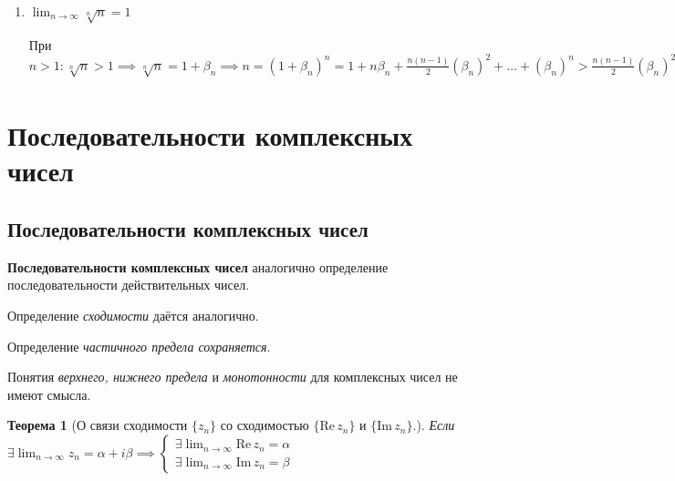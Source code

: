 \documentclass[a4paper,oneside]{article}
\newcommand{\imagin}{\mathrm{Im} \,}
\newcommand{\real}{\mathrm{Re} \,}
\newcommand{\dslim}{\displaystyle\lim}
\newcommand{\dslimn}{\dslim_{n \to \infty}}
\newtheorem{theorem}{Теорема}[subsection]
\begin{document}
\begin{enumerate}
    $\implies$ по \textit{$7^{\text{о}}$ свойству сходящихся последовательностей}
    $\dslimn \frac{a^n}{n!} = 0$

    
    \item $\dslimn \sqrt[n]{n} = 1$
    
    При $n > 1: \sqrt[n]{n} > 1 \implies \sqrt[n]{n} = 1 + \beta_n \implies
    n = (1 + \beta_n)^n = 1 + n \beta_n + \frac{n (n - 1)}{2} (\beta_n)^2 + \dots +
    (\beta_n)^n > \frac{n (n - 1)}{2} (\beta_n) ^ 2 \implies
    0 < \beta_n < \sqrt{\frac{2}{n-1}} \implies
    \dslimn \beta_n = 0 \implies
    \dslimn \sqrt[n]{n} = 1$
\end{enumerate}

\section{Последовательности комплексных чисел}

\subsection{Последовательности комплексных чисел}

\textbf{Последовательности комплексных чисел} аналогично определение последовательности
действительных чисел.

Определение \textit{сходимости} даётся аналогично.

Определение \textit{частичного предела сохраняется}.

Понятия \textit{верхнего, нижнего предела} и \textit{монотонности} для комплексных
чисел не имеют смысла.

\begin{theorem}[О связи сходимости $\{z_n\}$ со сходимостью $\{\real z_n\}$ и $\{\imagin z_n\}$.]
    Если $\exists \dslimn z_n = \alpha + i \beta
    \implies \begin{cases}
        \exists \dslimn \real z_n = \alpha \\
        \exists \dslimn \imagin z_n = \beta
    \end{cases}$        
\end{theorem}
\end{document}
